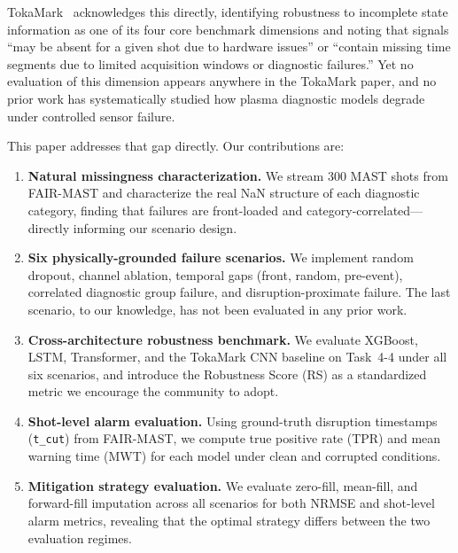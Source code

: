 \documentclass[10pt,twocolumn]{article}
\begin{document}
TokaMark~\cite{rousseau2026tokamark} acknowledges this directly,
identifying robustness to incomplete state information as one of its
four core benchmark dimensions and noting that signals ``may be absent
for a given shot due to hardware issues'' or ``contain missing time
segments due to limited acquisition windows or diagnostic failures.''
Yet no evaluation of this dimension appears anywhere in the TokaMark
paper, and no prior work has systematically studied how plasma
diagnostic models degrade under controlled sensor failure.

This paper addresses that gap directly. Our contributions are:

\begin{enumerate}
    \renewcommand{\labelenumi}{(\arabic{enumi})}
    \item \textbf{Natural missingness characterization.} We stream
    300 MAST shots from FAIR-MAST and characterize the real NaN
    structure of each diagnostic category, finding that failures
    are front-loaded and category-correlated—directly informing
    our scenario design.

    \item \textbf{Six physically-grounded failure scenarios.} We
    implement random dropout, channel ablation, temporal gaps (front,
    random, pre-event), correlated diagnostic group failure, and
    disruption-proximate failure. The last scenario, to our knowledge,
    has not been evaluated in any prior work.

    \item \textbf{Cross-architecture robustness benchmark.} We evaluate
    XGBoost, LSTM, Transformer, and the TokaMark CNN baseline on
    Task~4-4 under all six scenarios, and introduce the Robustness
    Score (RS) as a standardized metric we encourage the community
    to adopt.

    \item \textbf{Shot-level alarm evaluation.} Using ground-truth
    disruption timestamps (\texttt{t\_cut}) from FAIR-MAST, we compute
    true positive rate (TPR) and mean warning time (MWT) for each model
    under clean and corrupted conditions.

    \item \textbf{Mitigation strategy evaluation.} We evaluate zero-fill,
    mean-fill, and forward-fill imputation across all scenarios for both
    NRMSE and shot-level alarm metrics, revealing that the optimal
    strategy differs between the two evaluation regimes.
\end{enumerate}
\end{document}
